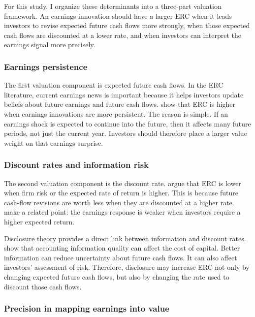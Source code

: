 \documentclass[12pt]{article}
\begin{document}
For this study, I organize these determinants into a three-part valuation framework. An earnings innovation should have a larger ERC when it leads investors to revise expected future cash flows more strongly, when those expected cash flows are discounted at a lower rate, and when investors can interpret the earnings signal more precisely.

\subsubsection{Earnings persistence}

The first valuation component is expected future cash flows. In the ERC literature, current earnings news is important because it helps investors update beliefs about future earnings and future cash flows. \citet{collinsKothari1989} show that ERC is higher when earnings innovations are more persistent. The reason is simple. If an earnings shock is expected to continue into the future, then it affects many future periods, not just the current year. Investors should therefore place a larger value weight on that earnings surprise.

\subsubsection{Discount rates and information risk}

The second valuation component is the discount rate. \citet{collinsKothari1989} argue that ERC is lower when firm risk or the expected rate of return is higher. This is because future cash-flow revisions are worth less when they are discounted at a higher rate. \citet{eastonZmijewski1989} make a related point: the earnings response is weaker when investors require a higher expected return.

Disclosure theory provides a direct link between information and discount rates. \citet{lambert_al2007} show that accounting information quality can affect the cost of capital. Better information can reduce uncertainty about future cash flows. It can also affect investors' assessment of risk. Therefore, disclosure may increase ERC not only by changing expected future cash flows, but also by changing the rate used to discount those cash flows.

\subsubsection{Precision in mapping earnings into value}
\end{document}
